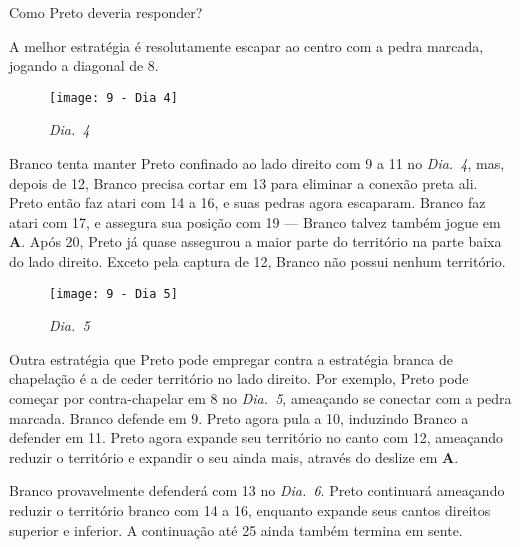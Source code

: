 Como Preto deveria responder?

A melhor estratégia é resolutamente escapar ao centro com a pedra marcada, jogando a diagonal de 8.

\begin{wrapfigure}{l}{60mm}
    \vspace{-22.5pt}
    \begin{center}
        \texttt{[image: 9 - Dia 4]}
        \captionsetup{justification=centering}
        \caption*{\emph{Dia.\@~4}}
    \end{center}
    \vspace{-20pt}
\end{wrapfigure}

Branco tenta manter Preto confinado ao lado direito com 9 a 11 no \emph{Dia.\@~4}, mas, depois de 12, Branco precisa cortar em 13 para eliminar a conexão preta ali. Preto então faz atari com 14 a 16, e suas pedras agora escaparam. Branco faz atari com 17, e assegura sua posição com 19 --- Branco talvez também jogue em \textbf{A}. Após 20, Preto já quase assegurou a maior parte do território na parte baixa do lado direito. Exceto pela captura de 12, Branco não possui nenhum território.

\pagebreak

\begin{wrapfigure}{r}{60mm}
    \vspace{-17.5pt}
    \begin{center}
        \texttt{[image: 9 - Dia 5]}
        \captionsetup{justification=centering}
        \caption*{\emph{Dia.\@~5}}
    \end{center}
    \vspace{-37.5pt}
\end{wrapfigure}

Outra estratégia que Preto pode empregar contra a estratégia branca de chapelação é a de ceder território no lado direito. Por exemplo, Preto pode começar por contra-chapelar em 8 no \emph{Dia.\@~5}, ameaçando se conectar com a pedra marcada. Branco defende em 9. Preto agora pula a 10, induzindo Branco a defender em 11. Preto agora expande seu território no canto com 12, ameaçando reduzir o território e expandir o seu ainda mais, através do deslize em \textbf{A}.

Branco provavelmente defenderá com 13 no \emph{Dia.\@~6}. Preto continuará ameaçando reduzir o território branco com 14 a 16, enquanto expande seus cantos direitos superior e inferior. A continuação até 25 ainda também termina em sente.

